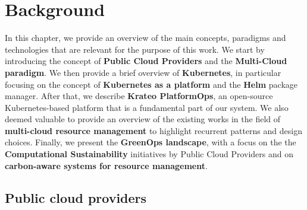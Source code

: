 \chapter{Background}
\label{cha:background}

In this chapter, we provide an overview of the main concepts, paradigms and technologies that are relevant for the purpose of this work.
We start by introducing the concept of \textbf{Public Cloud Providers} and the \textbf{Multi-Cloud paradigm}.
We then provide a brief overview of \textbf{Kubernetes}, in particular focusing on the concept of \textbf{Kubernetes as a platform} and the \textbf{Helm} package manager.
After that, we describe \textbf{Krateo PlatformOps}, an open-source Kubernetes-based platform that is a fundamental part of our system.
We also deemed valuable to provide an overview of the existing works in the field of \textbf{multi-cloud resource management} to highlight recurrent patterns and design choices.
Finally, we present the \textbf{GreenOps landscape}, with a focus on the the \textbf{Computational Sustainability} initiatives by Public Cloud Providers and on \textbf{carbon-aware systems for resource management}. 

\section{Public cloud providers}

